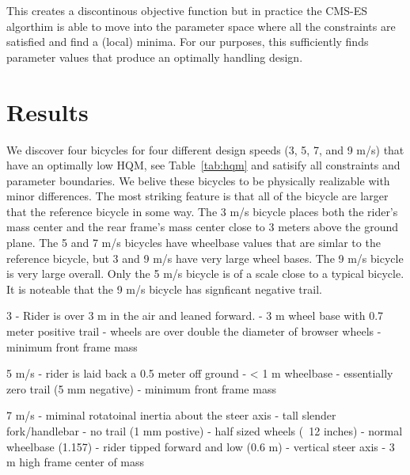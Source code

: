 \documentclass{bmd2019a}
\begin{document}
This creates a discontinous objective function but in practice the CMS-ES
algorthim is able to move into the parameter space where all the constraints
are satisfied and find a (local) minima. For our purposes, this sufficiently
finds parameter values that produce an optimally handling design.

\section{Results}
%
We discover four bicycles for four different design speeds (3, 5, 7, and 9 m/s)
that have an optimally low HQM, see Table~\ref{tab:hqm} and satisify all
constraints and parameter boundaries. We belive these bicycles to be physically
realizable with minor differences. The most striking feature is that all of the
bicycle are larger that the reference bicycle in some way.  The 3 m/s bicycle
places both the rider's mass center and the rear frame's mass center close to 3
meters above the ground plane. The 5 and 7 m/s bicycles have wheelbase values
that are simlar to the reference bicycle, but 3 and 9 m/s have very large wheel
bases. The 9 m/s bicycle is very large overall. Only the 5 m/s bicycle is of a
scale close to a typical bicycle. It is noteable that the 9 m/s bicycle has
signficant negative trail.

3
- Rider is over 3 m in the air and leaned forward.
- 3 m wheel base with 0.7 meter positive trail
- wheels are over double the diameter of browser wheels
- minimum front frame mass

5 m/s
- rider is laid back a 0.5 meter off ground
- < 1 m wheelbase
- essentially zero trail (5 mm negative)
- minimum front frame mass

7 m/s
- miminal rotatoinal inertia about the steer axis
- tall slender fork/handlebar
- no trail (1 mm postive)
- half sized wheels (~12 inches)
- normal wheelbase (1.157)
- rider tipped forward and low (0.6 m)
- vertical steer axis
- 3 m high frame center of mass
\end{document}
